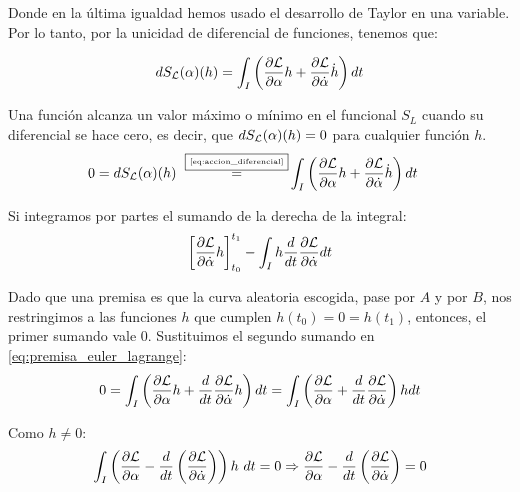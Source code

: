 Donde en la última igualdad hemos usado el desarrollo de Taylor en una variable.
Por lo tanto, por la unicidad de diferencial de funciones, tenemos que:

\begin{equation}
	\label{eq:accion_diferencial}
	dS_{\mathcal{L}}(\alpha)(h)=\int_{I}\left( \frac{\partial \mathcal{L}}{\partial\alpha}h+\frac{\partial \mathcal{L}}{\partial\dot{\alpha}}\dot{h}\right) dt
\end{equation}


Una función alcanza un valor máximo o mínimo en el funcional $S_L$ cuando su diferencial se hace cero, es decir, que $dS_{\mathcal{L}}(\alpha)(h)=0$ para cualquier función $h$.
\begin{equation*}
	\label{eq:premisa_euler_lagrange}
	\begin{split}
		0 = dS_{\mathcal{L}}(\alpha)(h)~\overset{\fbox{\tiny \ref{eq:accion_diferencial}}}{=}&\int_{I}\left( \frac{\partial \mathcal{L}}{\partial\alpha}h+\frac{\partial \mathcal{L}}{\partial\dot{\alpha}}\dot{h}\right) dt
	\end{split}
\end{equation*}

Si integramos por partes el sumando de la derecha de la integral:
\begin{equation}
	\left[ \frac{\partial \mathcal{L}}{\partial \dot{\alpha}}h \right]_{t_0}^{t_1}  - \int_I h \frac{d}{dt}\frac{\partial\mathcal{L}}{\partial\dot\alpha} dt
\end{equation}

Dado que una premisa es que la curva aleatoria escogida, pase por $A$ y por $B$, nos restringimos a las funciones $h$ que cumplen $h(t_0)=0=h(t_1)$, entonces, el primer sumando vale $0$. Sustituimos el segundo sumando en \eqref{eq:premisa_euler_lagrange}:
\begin{equation}
	0 = \int_{I}\left(\frac{\partial \mathcal{L}}{\partial\alpha}h + \frac{d}{dt}\frac{\partial\mathcal{L}}{\partial\dot\alpha}h \right)dt = \int_{I}\left(\frac{\partial \mathcal{L}}{\partial\alpha} + \frac{d}{dt}\frac{\partial\mathcal{L}}{\partial\dot\alpha} \right) h dt
\end{equation}

Como $h \neq 0$:
\begin{equation*}
	\int_{I}\left( \frac{\partial \mathcal{L}}{\partial \alpha}-\frac{d}{dt}\left( \frac{\partial \mathcal{L}}{\partial \dot{\alpha}} \right)\right)h\ dt = 0 \Rightarrow \frac{\partial \mathcal{L}}{\partial \alpha}-\frac{d}{dt}\left( \frac{\partial \mathcal{L}}{\partial \dot{\alpha}} \right) = 0
\end{equation*}

